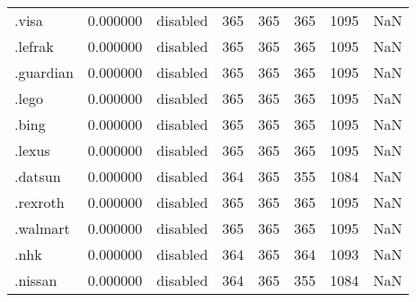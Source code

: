 \begin{tabular}{lrlrrrrl}
.visa                     &          0.000000 &        disabled &                         365 &                         365 &                         365 &                1095 &                  NaN \\
.lefrak                   &          0.000000 &        disabled &                         365 &                         365 &                         365 &                1095 &                  NaN \\
.guardian                 &          0.000000 &        disabled &                         365 &                         365 &                         365 &                1095 &                  NaN \\
.lego                     &          0.000000 &        disabled &                         365 &                         365 &                         365 &                1095 &                  NaN \\
.bing                     &          0.000000 &        disabled &                         365 &                         365 &                         365 &                1095 &                  NaN \\
.lexus                    &          0.000000 &        disabled &                         365 &                         365 &                         365 &                1095 &                  NaN \\
.datsun                   &          0.000000 &        disabled &                         364 &                         365 &                         355 &                1084 &                  NaN \\
.rexroth                  &          0.000000 &        disabled &                         365 &                         365 &                         365 &                1095 &                  NaN \\
.walmart                  &          0.000000 &        disabled &                         365 &                         365 &                         365 &                1095 &                  NaN \\
.nhk                      &          0.000000 &        disabled &                         364 &                         365 &                         364 &                1093 &                  NaN \\
.nissan                   &          0.000000 &        disabled &                         364 &                         365 &                         355 &                1084 &                  NaN \\

\end{tabular}
